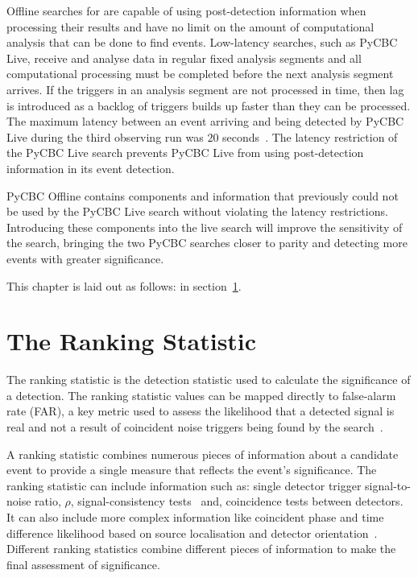 Offline searches for \gws are capable of using post-detection information when processing their results and have no limit on the amount of computational analysis that can be done to find events. Low-latency \gwadj searches, such as PyCBC Live, receive and analyse data in regular fixed analysis segments and all computational processing must be completed before the next analysis segment arrives. If the triggers in an analysis segment are not processed in time, then lag is introduced as a backlog of triggers builds up faster than they can be processed. The maximum latency between an event arriving and being detected by PyCBC Live during the third observing run was $20$ seconds~\cite{PyCBC:2017}. The latency restriction of the PyCBC Live search prevents PyCBC Live from using post-detection information in its event detection.

PyCBC Offline contains components and information that previously could not be used by the PyCBC Live search without violating the latency restrictions. Introducing these components into the live search will improve the sensitivity of the \gwadj search, bringing the two PyCBC searches closer to parity and detecting more \gwadj events with greater significance.

This chapter is laid out as follows: in section~\ref{}.

\section{\label{5:sec:ranking-stat}The Ranking Statistic}

The ranking statistic is the detection statistic used to calculate the significance of a \gwadj detection. The ranking statistic values can be mapped directly to false-alarm rate (FAR), a key metric used to assess the likelihood that a detected signal is real and not a result of coincident noise triggers being found by the \gwadj search~\cite{PyCBC_global:2020}.

A ranking statistic combines numerous pieces of information about a candidate event to provide a single measure that reflects the event's significance. The ranking statistic can include information such as: single detector trigger signal-to-noise ratio, $\rho$, signal-consistency tests~\cite{Allen_Chi:2005, rw_snr_eq:2012, PyCBC_sg:2018} and, coincidence tests between detectors. It can also include more complex information like coincident phase and time difference likelihood based on source localisation and detector orientation~\cite{PyCBC:2017, PyCBC_singles:2022}. Different ranking statistics combine different pieces of information to make the final assessment of significance.

